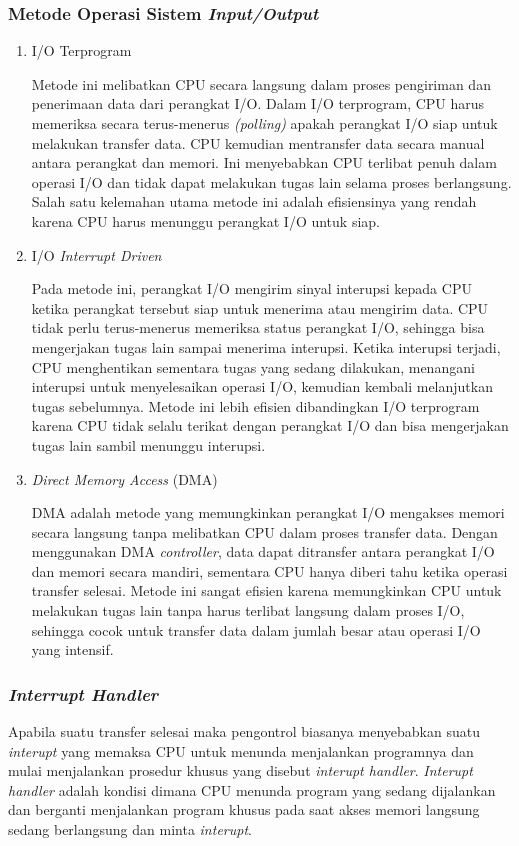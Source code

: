 \documentclass[12pt]{article}
\begin{document}
\subsubsection{Metode Operasi Sistem \textit{Input/Output}}
\begin{enumerate}
    \item I/O Terprogram \par
    Metode ini melibatkan CPU secara langsung dalam proses pengiriman dan penerimaan data dari perangkat I/O. Dalam I/O terprogram, CPU harus memeriksa secara terus-menerus \textit{(polling)} apakah perangkat I/O siap untuk melakukan transfer data. CPU kemudian mentransfer data secara manual antara perangkat dan memori. Ini menyebabkan CPU terlibat penuh dalam operasi I/O dan tidak dapat melakukan tugas lain selama proses berlangsung. Salah satu kelemahan utama metode ini adalah efisiensinya yang rendah karena CPU harus menunggu perangkat I/O untuk siap.
    
    \item I/O \emph{Interrupt Driven} \par
    Pada metode ini, perangkat I/O mengirim sinyal interupsi kepada CPU ketika perangkat tersebut siap untuk menerima atau mengirim data. CPU tidak perlu terus-menerus memeriksa status perangkat I/O, sehingga bisa mengerjakan tugas lain sampai menerima interupsi. Ketika interupsi terjadi, CPU menghentikan sementara tugas yang sedang dilakukan, menangani interupsi untuk menyelesaikan operasi I/O, kemudian kembali melanjutkan tugas sebelumnya. Metode ini lebih efisien dibandingkan I/O terprogram karena CPU tidak selalu terikat dengan perangkat I/O dan bisa mengerjakan tugas lain sambil menunggu interupsi.
    
    \item \emph{Direct Memory Access} (DMA) \par
    DMA adalah metode yang memungkinkan perangkat I/O mengakses memori secara langsung tanpa melibatkan CPU dalam proses transfer data. Dengan menggunakan DMA \emph{controller}, data dapat ditransfer antara perangkat I/O dan memori secara mandiri, sementara CPU hanya diberi tahu ketika operasi transfer selesai. Metode ini sangat efisien karena memungkinkan CPU untuk melakukan tugas lain tanpa harus terlibat langsung dalam proses I/O, sehingga cocok untuk transfer data dalam jumlah besar atau operasi I/O yang intensif.
\end{enumerate}

\subsubsection{\emph{Interrupt Handler}}
Apabila suatu transfer selesai maka pengontrol biasanya menyebabkan suatu \textit{interupt} yang memaksa CPU untuk menunda menjalankan programnya dan mulai menjalankan prosedur khusus yang disebut \emph{interupt handler}. \emph{Interupt handler} adalah kondisi dimana CPU menunda program yang sedang dijalankan dan berganti menjalankan program khusus pada saat akses memori langsung sedang berlangsung dan minta \emph{interupt}.
\end{document}
